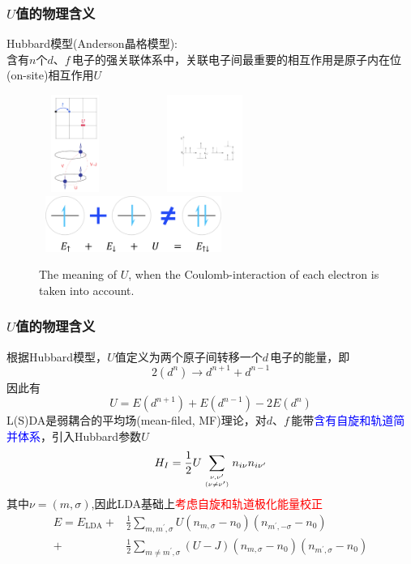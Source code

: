 \frame
{
\frametitle{$U$值的物理含义}
\textrm{Hubbard}模型(\textrm{Anderson晶格模型}):\\含有$n$个$d$、$f$\,电子的强关联体系中，关联电子间最重要的相互作用是原子内在位(\textrm{on-site})相互作用$U$
\begin{figure}[h!]
\centering
\includegraphics[height=1.25in,width=0.92in,viewport=1 1 240 375,clip]{Figures/LDA_U-1.png}
\includegraphics[height=1.25in,width=2.32in,viewport=110 210 545 455,clip]{Figures/LDA_U.pdf}
\includegraphics[height=0.72in,width=2.42in,viewport=0 0 1430 460,clip]{Figures/correalation-energy.png}
\caption{\tiny \textrm{The meaning of $U$, when the Coulomb-interaction of each electron is taken into account.}}%
\label{Tetrahedron_weight}
\end{figure}
}

\frame
{
\frametitle{$U$值的物理含义}
根据\textrm{Hubbard}模型，\textrm{$U$}值定义为两个原子间转移一个$d$\,电子的能量，即
$$2(d^n)\rightarrow d^{n+1}+d^{n-1}$$
因此有
$$U=E(d^{n+1})+E(d^{n-1})-2E(d^n)$$
\textrm{L(S)DA}是弱耦合的平均场(\textrm{mean-filed, MF})理论，对$d$、$f$\,能带\textcolor{blue}{含有自旋和轨道简并体系}，引入\textrm{Hubbard}参数$U$
\begin{displaymath}
	H_I=\frac12U\sum\limits_{\nu,\nu^{\prime}\atop(\nu\neq\nu^{\prime})}n_{i\nu}n_{i\nu^{\prime}}
\end{displaymath}
其中$\nu=(m,\sigma)$,因此\textrm{LDA}基础上\textcolor{red}{考虑自旋和轨道极化能量校正}
\begin{displaymath}
	\begin{aligned}
		E=E_{\mathrm{LDA}}+&\frac12\sum_{m,m^{\prime},\sigma}U(n_{m,\sigma}-n_0)(n_{m^{\prime},-\sigma}-n_0)\\
		+&\frac12\sum_{m\neq m^{\prime},\sigma}(U-J)(n_{m,\sigma}-n_0)(n_{m^{\prime},\sigma}-n_0)
	\end{aligned}
\end{displaymath}
}

